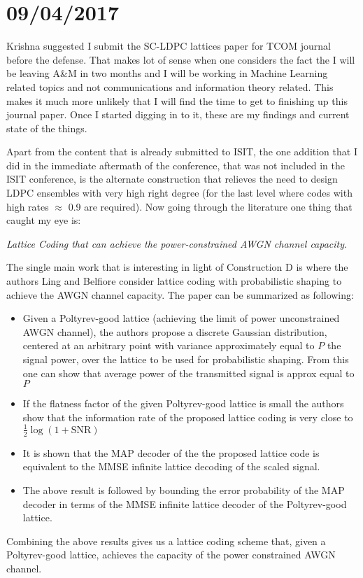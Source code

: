 \documentclass[12pt]{article}
\begin{document}
\section{09/04/2017}

Krishna suggested I submit the SC-LDPC lattices paper for TCOM journal before the defense. That makes lot of sense when one considers the fact the I will be leaving A\&M in two months and I will be working in Machine Learning related topics and not communications and information theory related. This makes it much more unlikely that I will find the time to get to finishing up this journal paper. Once I started digging in to it, these are my findings and current state of the things.

Apart from the content that is already submitted to ISIT, the one addition that I did in the immediate aftermath of the conference, that was not included in the ISIT conference, is the alternate construction that relieves the need to design LDPC ensembles with very high right degree (for the last level where codes with high rates $\approx$ 0.9 are required). Now going through the literature one thing that caught my eye is:

\textit{Lattice Coding that can achieve the power-constrained AWGN channel capacity}.

The single main work that is interesting in light of Construction D is \cite{ling2014achieving} where the authors Ling and Belfiore consider lattice coding with probabilistic shaping to achieve the AWGN channel capacity. The paper can be summarized as following:
\begin{itemize}
\item Given a Poltyrev-good lattice (achieving the limit of power unconstrained AWGN channel), the authors propose a discrete Gaussian distribution, centered at an arbitrary point with variance approximately equal to $P$ the signal power, over the lattice to be used for probabilistic shaping. From this one can show that average power of the transmitted signal is approx equal to $P$
\item If the flatness factor of the given Poltyrev-good lattice is small the authors show that the information rate of the proposed lattice coding is very close to $\frac{1}{2}\log (1+\text{SNR})$
\item It is shown that the MAP decoder of the the proposed lattice code is equivalent to the MMSE infinite lattice decoding of the scaled signal.
\item The above result is followed by bounding the error probability of the MAP decoder in terms of the MMSE infinite lattice decoder of the Poltyrev-good lattice.
\end{itemize}
Combining the above results gives us a lattice coding scheme that, given a Poltyrev-good lattice, achieves the capacity of the power constrained AWGN channel. 
\end{document}
